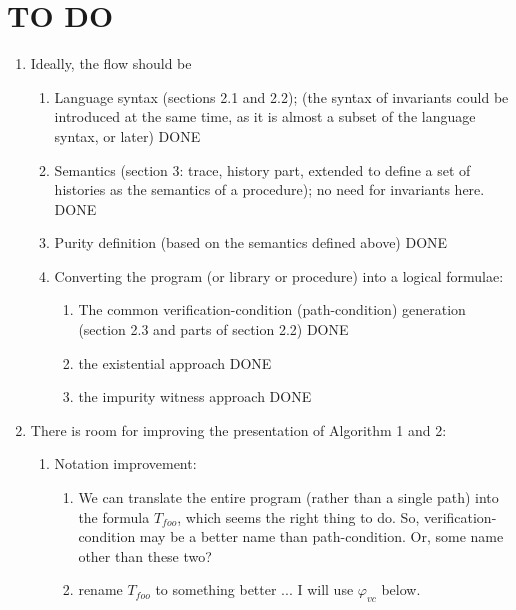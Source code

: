 \section*{TO DO}

\begin{enumerate}

\item Ideally, the flow should be
\begin{enumerate}
\item Language syntax (sections 2.1 and 2.2); (the syntax of invariants could be
introduced at the same time, as it is almost a subset of the language syntax, or later)
DONE

\item Semantics (section 3: trace, history part, extended to define a set of histories
as the semantics of a procedure); no need for invariants here.
DONE

\item Purity definition (based on the semantics defined above)
DONE

\item Converting the program (or library or procedure) into a logical formulae:
\begin{enumerate}
\item The common verification-condition (path-condition) generation (section 2.3
and parts of section 2.2)
DONE
\item the existential approach
DONE
\item the impurity witness approach
DONE
\end{enumerate}

\end{enumerate}


\item There is room for improving the presentation of Algorithm 1 and 2:
\begin{enumerate}

\item Notation improvement:
\begin{enumerate}
\item We can translate the entire program (rather than a single path)
into the formula $T_{foo}$, which seems the right thing to do. So,
verification-condition may be a better name than path-condition.
Or, some name other than these two?
\item rename $T_{foo}$ to something better ... I will use $\varphi_{vc}$
below.
\end{enumerate}


\end{enumerate}
\end{enumerate}
